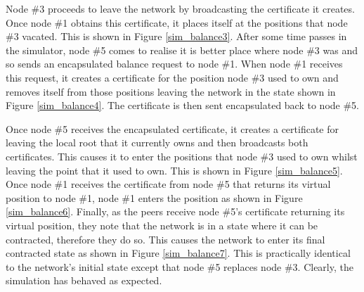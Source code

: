 \documentclass[ %
                    author={Luke Murray},
                supervisor={Dr. Simon Hollis},
                     title={Shadow Peer-to-Peer Networks},
                  subtitle={},
                    degree={MEng},
                      year={2013} ]{thesis}
\begin{document}
Node \#3 proceeds to leave the network by broadcasting the certificate it creates. Once node \#1 obtains this certificate, it places itself at the positions that node \#3 vacated. This is shown in Figure \ref{sim_balance3}. After some time passes in the simulator, node \#5 comes to realise it is better place where node \#3 was and so sends an encapsulated balance request to node \#1. When node \#1 receives this request, it creates a certificate for the position node \#3 used to own and removes itself from those positions leaving the network in the state shown in Figure \ref{sim_balance4}. The certificate is then sent encapsulated back to node \#5.



Once node \#5 receives the encapsulated certificate, it creates a certificate for leaving the local root that it currently owns and then broadcasts both certificates. This causes it to enter the positions that node \#3 used to own whilst leaving the point that it used to own. This is shown in Figure \ref{sim_balance5}. Once node \#1 receives the certificate from node \#5 that returns its virtual position to node \#1, node \#1 enters the position as shown in Figure \ref{sim_balance6}. Finally, as the peers receive node \#5's certificate returning its virtual position, they note that the network is in a state where it can be contracted, therefore they do so. This causes the network to enter its final contracted state as shown in Figure \ref{sim_balance7}. This is practically identical to the network's initial state except that node \#5 replaces node \#3. Clearly, the simulation has behaved as expected.
\end{document}

